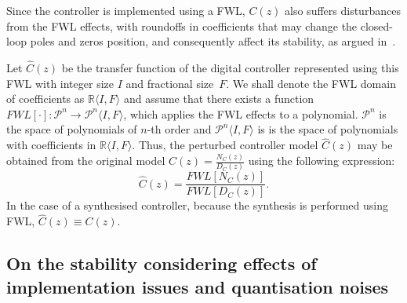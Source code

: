 \documentclass{sig-alternate-05-2015}
\newcommand{\red}[1]{{\color{red}#1}}
\begin{document}
Since the controller is implemented using a FWL, $C(z)$ also suffers
disturbances from the FWL effects, with roundoffs in coefficients that may
change the closed-loop poles and zeros position, and consequently affect its
stability, as argued in~\cite{Bessa16}.

Let $\hat{C}(z)$ be the transfer function of the digital controller
represented using this FWL with integer size $I$ and fractional size~$F$. 
We shall denote the FWL domain of coefficients as $\mathbb{R}\langle I,F
\rangle$
%
%
and assume that there exists a function
$FWL[\cdot]:\mathcal{P}^{n}\rightarrow \mathcal{P}^{n}\langle I,F \rangle$,
which applies the FWL effects to a polynomial.  $\mathcal{P}^{n}$ is the
space of polynomials of $n$-th order and $\mathcal{P}^{n}\langle I,F
\rangle$ is is the space of polynomials with coefficients in
$\mathbb{R}\langle I,F \rangle$.
%
%
Thus, the perturbed controller model $\hat{C}(z)$ may be obtained from the
original model $C(z)=\frac{N_{C}(z)}{D_{C}(z)}$ using the following
expression:
%
\begin{equation}
\hat{C}(z)=\frac{FWL[N_{C}(z)]}{FWL[D_{C}(z)]}.
\end{equation}
%
In the case of a synthesised controller, because the synthesis is performed
using FWL, $\hat{C}(z) \equiv C(z)$.

%

\subsection{On the stability considering effects of implementation issues and quantisation noises}
\label{sec:stability}
\end{document}

